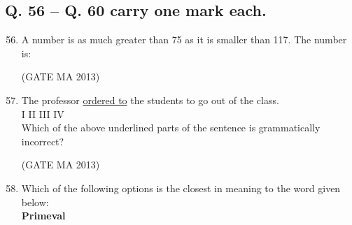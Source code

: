 \documentclass[journal,12pt,onecolumn]{IEEEtran}
\theoremstyle{remark}
\begin{document}
\subsection*{Q. 56 – Q. 60 carry one mark each.}
\begin{enumerate}
    \setcounter{enumi}{55}
    \item A number is as much greater than 75 as it is smaller than 117. The number is:
    \begin{enumerate}
    \end{enumerate}
    \hfill (GATE MA 2013)
    \item The professor \underline{ordered to} the students to go out of the class. \\
    \hspace*{2cm} I \hspace{1.2cm} II \hspace{1.3cm} III \hspace{1.8cm} IV \\
    Which of the above underlined parts of the sentence is grammatically incorrect?
    \begin{enumerate}
    \end{enumerate}
    \hfill (GATE MA 2013)
    \item Which of the following options is the closest in meaning to the word given below: \\
    \textbf{Primeval}
    \begin{enumerate}
    \end{enumerate}

\end{enumerate}
\end{document}
